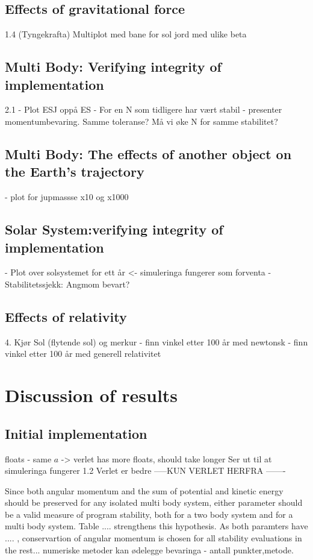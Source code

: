 \documentclass[%
oneside,                 %
final,                   %
10pt]{article}
\begin{document}
\subsection{Effects of gravitational force}
1.4 (Tyngekrafta)  Multiplot med bane for sol jord med ulike beta

\subsection{Multi Body: Verifying integrity of implementation }
2.1 - Plot ESJ oppå ES
    - For en N som tidligere har vært stabil - presenter momentumbevaring. Samme toleranse? Må vi øke N for samme stabilitet?
\subsection{Multi Body: The effects of another object on the Earth's trajectory}
    - plot for jupmassse x10 og x1000

\subsection{Solar System:verifying integrity of implementation }
- Plot over solsystemet for ett år <- simuleringa fungerer som forventa
- Stabilitetssjekk: Angmom bevart? 

\subsection{Effects of relativity}
4. Kjør Sol (flytende sol) og merkur 
- finn vinkel etter 100 år med newtonsk
- finn vinkel etter 100 år med generell relativitet

\section{Discussion of results}

\subsection{Initial implementation}
\label{subsec:Discofres:initimpl}
floats - same $a$ -> verlet has more floats, should take longer
\label{subsec:Init_implm}
 Ser ut til at simuleringa fungerer
1.2 Verlet er bedre
 -----KUN VERLET HERFRA -------
 
Since both angular momentum and the sum of potential and kinetic energy should be preserved for any isolated multi body system, either parameter should be a valid measure of program stability, both for a two body system and for a multi body system. Table .... strengthens this hypothesis. As both paramters have .... , conservartion of angular momentum is chosen for all stability evaluations in the rest... numeriske metoder kan ødelegge bevaringa - antall punkter,metode.
 
\end{document}
